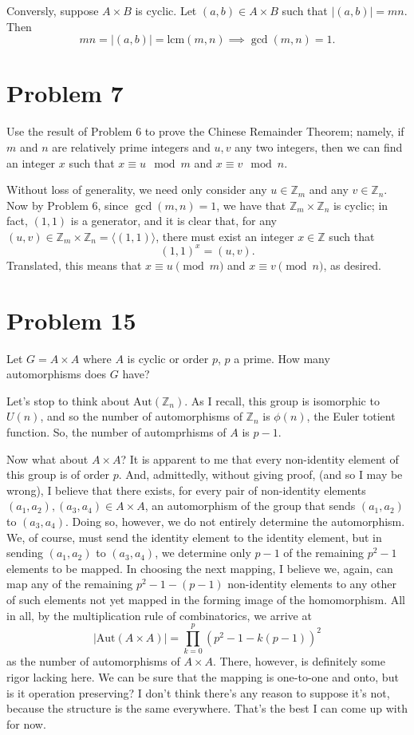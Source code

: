 \documentclass[12pt]{article}
\newcommand{\lcm}{\mbox{lcm}}
\newcommand{\Z}{\mathbb{Z}}
\newcommand{\aut}{\mbox{Aut}}
\begin{document}
Conversly, suppose $A\times B$ is cyclic.  Let $(a,b)\in A\times B$ such that $|(a,b)|=mn$.
Then
\begin{equation*}
mn=|(a,b)|=\lcm(m,n)\implies\gcd(m,n)=1.
\end{equation*}

\section*{Problem 7}

Use the result of Problem 6 to prove the Chinese Remainder Theorem; namely, if $m$ and $n$
are relatively prime integers and $u,v$ any two integers, then we can find an integer $x$ such that
$x\equiv u\mod m$ and $x\equiv v\mod n$.

Without loss of generality, we need only consider any $u\in\Z_m$ and any $v\in\Z_n$.
Now by Problem 6, since $\gcd(m,n)=1$, we have that $\Z_m\times\Z_n$ is cyclic;
in fact, $(1,1)$ is a generator, and it is clear that, for any $(u,v)\in\Z_m\times\Z_n=\langle(1,1)\rangle$,
there must exist an integer $x\in\Z$ such that
\begin{equation*}
(1,1)^x=(u,v).
\end{equation*}
Translated, this means that $x\equiv u\pmod{m}$ and $x\equiv v\pmod{n}$, as desired.

\section*{Problem 15}

Let $G=A\times A$ where $A$ is cyclic or order $p$, $p$ a prime.  How many automorphisms does $G$ have?

Let's stop to think about $\aut(\Z_n)$.  As I recall, this group is isomorphic to $U(n)$, and so the number of
automorphisms of $\Z_n$ is $\phi(n)$, the Euler totient function.  So, the number of automprhisms of $A$
is $p-1$.

Now what about $A\times A$?  It is apparent to me that every non-identity element of this group is
of order $p$.  And, admittedly, without giving proof, (and so I may be wrong), I believe that there
exists, for every pair of non-identity elements $(a_1,a_2),(a_3,a_4)\in A\times A$, an automorphism of the group that sends $(a_1,a_2)$
to $(a_3,a_4)$.  Doing so, however, we do not entirely determine the automorphism.  We, of course, must send
the identity element to the identity element, but in sending $(a_1,a_2)$ to $(a_3,a_4)$, we determine only
$p-1$ of the remaining $p^2-1$ elements to be mapped.  In choosing the next mapping, I believe we, again,
can map any of the remaining $p^2-1-(p-1)$ non-identity elements to any other of such elements not yet mapped
in the forming image of the homomorphism.  All in all,
by the multiplication rule of combinatorics, we arrive at
\begin{equation*}
|\aut(A\times A)|=\prod_{k=0}^p(p^2-1-k(p-1))^2
\end{equation*}
as the number of automorphisms of $A\times A$.  There, however, is definitely some rigor lacking here.
We can be sure that the mapping is one-to-one and onto, but is it operation preserving?  I don't think there's
any reason to suppose it's not, because the structure is the same everywhere.  That's the best I can come up
with for now.
\end{document}
